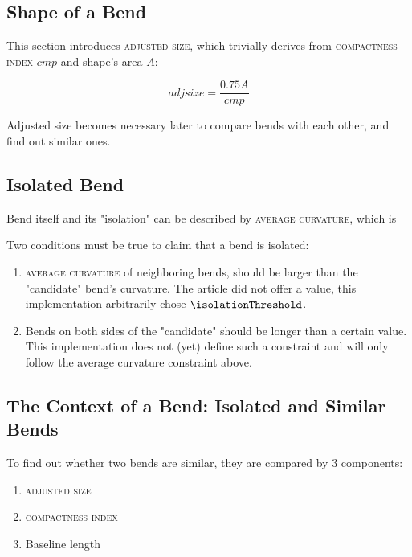 \documentclass[a4paper]{article}
\begin{document}
\subsection{Shape of a Bend}

This section introduces \textsc{adjusted size}, which trivially derives from
\textsc{compactness index} $cmp$ and shape's area $A$:

\[
    adjsize = \frac{0.75 A}{cmp}
\]

Adjusted size becomes necessary later to compare bends with each other, and
find out similar ones.

\subsection{Isolated Bend}

Bend itself and its "isolation" can be described by \textsc{average curvature},
which is 

Two conditions must be true to claim that a bend is isolated:

\begin{enumerate}
    \item \textsc{average curvature} of neighboring bends, should be larger
        than the "candidate" bend's curvature. The article did not offer a
        value, this implementation arbitrarily chose $\isolationThreshold$.

    \item Bends on both sides of the "candidate" should be longer than a
        certain value. This implementation does not (yet) define such a
        constraint and will only follow the average curvature constraint above.
\end{enumerate}

\subsection{The Context of a Bend: Isolated and Similar Bends}

To find out whether two bends are similar, they are compared by 3 components:

\begin{enumerate}
    \item \textsc{adjusted size}
    \item \textsc{compactness index}
    \item Baseline length
\end{enumerate}
\end{document}
